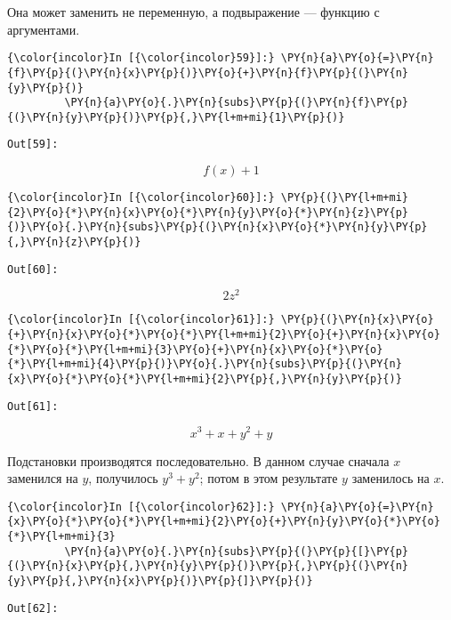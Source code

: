     

    Она может заменить не переменную, а подвыражение --- функцию с
аргументами.

    \begin{Verbatim}[commandchars=\\\{\}]
{\color{incolor}In [{\color{incolor}59}]:} \PY{n}{a}\PY{o}{=}\PY{n}{f}\PY{p}{(}\PY{n}{x}\PY{p}{)}\PY{o}{+}\PY{n}{f}\PY{p}{(}\PY{n}{y}\PY{p}{)}
         \PY{n}{a}\PY{o}{.}\PY{n}{subs}\PY{p}{(}\PY{n}{f}\PY{p}{(}\PY{n}{y}\PY{p}{)}\PY{p}{,}\PY{l+m+mi}{1}\PY{p}{)}
\end{Verbatim}
\texttt{\color{outcolor}Out[{\color{outcolor}59}]:}
    
    \[f{\left (x \right )} + 1\]

    

    \begin{Verbatim}[commandchars=\\\{\}]
{\color{incolor}In [{\color{incolor}60}]:} \PY{p}{(}\PY{l+m+mi}{2}\PY{o}{*}\PY{n}{x}\PY{o}{*}\PY{n}{y}\PY{o}{*}\PY{n}{z}\PY{p}{)}\PY{o}{.}\PY{n}{subs}\PY{p}{(}\PY{n}{x}\PY{o}{*}\PY{n}{y}\PY{p}{,}\PY{n}{z}\PY{p}{)}
\end{Verbatim}
\texttt{\color{outcolor}Out[{\color{outcolor}60}]:}
    
    \[2 z^{2}\]

    

    \begin{Verbatim}[commandchars=\\\{\}]
{\color{incolor}In [{\color{incolor}61}]:} \PY{p}{(}\PY{n}{x}\PY{o}{+}\PY{n}{x}\PY{o}{*}\PY{o}{*}\PY{l+m+mi}{2}\PY{o}{+}\PY{n}{x}\PY{o}{*}\PY{o}{*}\PY{l+m+mi}{3}\PY{o}{+}\PY{n}{x}\PY{o}{*}\PY{o}{*}\PY{l+m+mi}{4}\PY{p}{)}\PY{o}{.}\PY{n}{subs}\PY{p}{(}\PY{n}{x}\PY{o}{*}\PY{o}{*}\PY{l+m+mi}{2}\PY{p}{,}\PY{n}{y}\PY{p}{)}
\end{Verbatim}
\texttt{\color{outcolor}Out[{\color{outcolor}61}]:}
    
    \[x^{3} + x + y^{2} + y\]

    

    Подстановки производятся последовательно. В данном случае сначала \(x\)
заменился на \(y\), получилось \(y^3+y^2\); потом в этом результате
\(y\) заменилось на \(x\).

    \begin{Verbatim}[commandchars=\\\{\}]
{\color{incolor}In [{\color{incolor}62}]:} \PY{n}{a}\PY{o}{=}\PY{n}{x}\PY{o}{*}\PY{o}{*}\PY{l+m+mi}{2}\PY{o}{+}\PY{n}{y}\PY{o}{*}\PY{o}{*}\PY{l+m+mi}{3}
         \PY{n}{a}\PY{o}{.}\PY{n}{subs}\PY{p}{(}\PY{p}{[}\PY{p}{(}\PY{n}{x}\PY{p}{,}\PY{n}{y}\PY{p}{)}\PY{p}{,}\PY{p}{(}\PY{n}{y}\PY{p}{,}\PY{n}{x}\PY{p}{)}\PY{p}{]}\PY{p}{)}
\end{Verbatim}
\texttt{\color{outcolor}Out[{\color{outcolor}62}]:}
    
